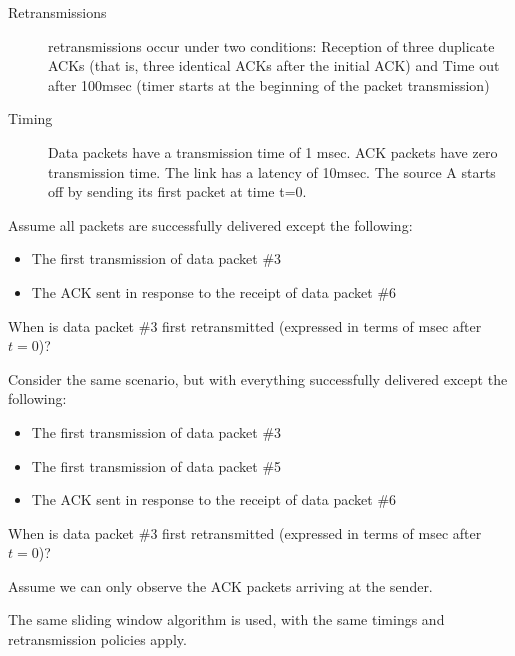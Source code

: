 \documentclass{supervision}
\begin{document}
\begin{questions}
\begin{parts}
            \begin{description}
              \item[Retransmissions] retransmissions occur under two
                conditions: Reception of three duplicate ACKs (that is, three
                identical ACKs after the initial ACK) and Time out after
                100msec (timer starts at the beginning of the packet
                transmission)
              \item[Timing] Data packets have a transmission time of 1 msec.
                ACK packets have zero transmission time.
                The link has a latency of 10msec.
                The source A starts off by sending its first packet at time t=0.
            \end{description}

            \begin{subparts}
              \subpart Assume all packets are successfully delivered except the
                following:
                \begin{itemize}
                  \item The first transmission of data packet \#3
                  \item The ACK sent in response to the receipt of data packet
                    \#6
                \end{itemize}
                When is data packet \#3 first retransmitted (expressed in terms
                of msec after $t=0$)?

              \subpart Consider the same scenario, but with everything
                successfully delivered except the following:
                \begin{itemize}
                  \item The first transmission of data packet \#3
                  \item The first transmission of data packet \#5
                  \item The ACK sent in response to the receipt of data packet
                    \#6
                \end{itemize}

                When is data packet \#3 first retransmitted (expressed in terms
                of msec after $t=0$)?

              \subpart Assume we can only observe the ACK packets arriving at
                the sender.

                The same sliding window algorithm is used, with the same
                timings and retransmission policies apply.


\end{subparts}
\end{parts}
\end{questions}
\end{document}
